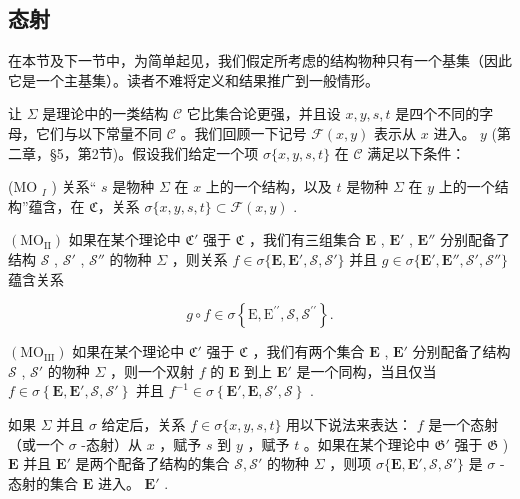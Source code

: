 \subsection{态射}

在本节及下一节中，为简单起见，我们假定所考虑的结构物种只有一个基集（因此它是一个主基集）。读者不难将定义和结果推广到一般情形。

让 \(\Sigma\) 是理论中的一类结构 \(\mathcal{C}\) 它比集合论更强，并且设 \(x, y, s, t\) 是四个不同的字母，它们与以下常量不同 \(\mathcal{C}\) 。我们回顾一下记号 \(\mathcal{F}(x, y)\) 表示从 \(x\) 进入。 \(y\) (第二章，§5，第2节)。假设我们给定一个项 \(\sigma\{x, y, s, t\}\) 在 \(\mathcal{C}\) 满足以下条件：

(MO \(_{I}\) ) 关系“ \(s\) 是物种 \(\Sigma\) 在 \(x\) 上的一个结构，以及 \(t\) 是物种 \(\Sigma\) 在 \(y\) 上的一个结构”蕴含，在 \(\mathfrak{C}\)，关系 \(\sigma\{x,y,s,t\} \subset \mathcal{F}(x,y)\) .

\((\mathrm{MO}_{\mathrm{II}})\) 如果在某个理论中 \(\mathfrak{C}'\) 强于 \(\mathfrak{C}\) ，我们有三组集合 \(\mathbf{E}\) , \(\mathbf{E}'\) , \(\mathbf{E}''\) 分别配备了结构 \(\mathscr{S}\) , \(\mathscr{S}'\) , \(\mathscr{S}''\) 的物种 \(\Sigma\) ，则关系 \(f \in \sigma \{ \mathbf{E}, \mathbf{E}', \mathscr{S}, \mathscr{S}' \}\) 并且 \(g \in \sigma \{ \mathbf{E}', \mathbf{E}'', \mathscr{S}', \mathscr{S}'' \}\) 蕴含关系

\[
g \circ f \in \sigma \left\{\mathrm{E}, \mathrm{E} ^ {\prime \prime}, \mathscr {S}, \mathscr {S} ^ {\prime \prime} \right\}.
\]

\((\mathrm{MO}_{\mathrm{III}})\) 如果在某个理论中 \(\mathfrak{C}'\) 强于 \(\mathfrak{C}\) ，我们有两个集合 \(\mathbf{E}\) , \(\mathbf{E}'\) 分别配备了结构 \(\mathcal{S}\) , \(\mathcal{S}'\) 的物种 \(\Sigma\) ，则一个双射 \(f\) 的 \(\mathbf{E}\) 到上 \(\mathbf{E}'\) 是一个同构，当且仅当 \(f \in \sigma \left\{\mathbf{E}, \mathbf{E}', \mathcal{S}, \mathcal{S}'\right\}\) 并且 \(f^{-1} \in \sigma \left\{\mathbf{E}', \mathbf{E}, \mathcal{S}', \mathcal{S}\right\}\) .

如果 \(\Sigma\) 并且 \(\sigma\) 给定后，关系 \(f \in \sigma\{x, y, s, t\}\) 用以下说法来表达： \(f\) 是一个态射（或一个 \(\sigma\) -态射）从 \(x\) ，赋予 \(s\) 到 \(y\) ，赋予 \(t\) 。如果在某个理论中 \(\mathfrak{G}'\) 强于 \(\mathfrak{G}\) ) \(\mathbf{E}\) 并且 \(\mathbf{E}'\) 是两个配备了结构的集合 \(\mathcal{S}, \mathcal{S}'\) 的物种 \(\Sigma\) ，则项 \(\sigma\{\mathbf{E}, \mathbf{E}', \mathcal{S}, \mathcal{S}'\}\) 是 \(\sigma\) -态射的集合 \(\mathbf{E}\) 进入。 \(\mathbf{E}'\) .


